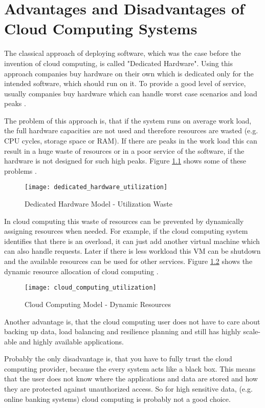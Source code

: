 \chapter{Advantages and Disadvantages of Cloud Computing Systems}
\label{chap:advantages}

The classical approach of deploying software, which was the case before the invention of cloud computing, is called "Dedicated Hardware". Using this approach companies buy hardware on their own which is dedicated only for the intended software, which should run on it. To provide a good level of service, usually companies buy hardware which can handle worst case scenarios and load peaks \cite{Gajbhiye_2014}.

The problem of this approach is, that if the system runs on average work load, the full hardware capacities are not used and therefore resources are wasted (e.g. CPU cycles, storage space or RAM). If there are peaks in the work load this can result in a huge waste of resources or in a poor service of the software, if the hardware is not designed for such high peaks. Figure \ref{fig:dedicated_hardware_utilization} shows some of these problems \cite{Gajbhiye_2014}.

\begin{figure}
	\centering
		\texttt{[image: dedicated\_hardware\_utilization]}
	\caption{Dedicated Hardware Model - Utilization Waste \cite{Gajbhiye_2014}}
	\label{fig:dedicated_hardware_utilization}
\end{figure}

In cloud computing this waste of resources can be prevented by dynamically assigning resources when needed. For example, if the cloud computing system identifies that there is an overload, it can just add another virtual machine which can also handle requests. Later if there is less workload this VM can be shutdown and the available resources can be used for other services. Figure \ref{fig:cloud_computing_utilization} shows the dynamic resource allocation of cloud computing \cite{Gajbhiye_2014}.

\begin{figure}
	\centering
		\texttt{[image: cloud\_computing\_utilization]}
	\caption{Cloud Computing Model - Dynamic Resources \cite{Gajbhiye_2014}}
	\label{fig:cloud_computing_utilization}
\end{figure}

Another advantage is, that the cloud computing user does not have to care about backing up data, load balancing and resilience planning and still has highly scale-able and highly available applications.

Probably the only disadvantage is, that you have to fully trust the cloud computing provider, because the every system acts like a black box. This means that the user does not know where the applications and data are stored and how they are protected against unauthorized access. So for high sensitive data, (e.g. online banking systems) cloud computing is probably not a good choice.